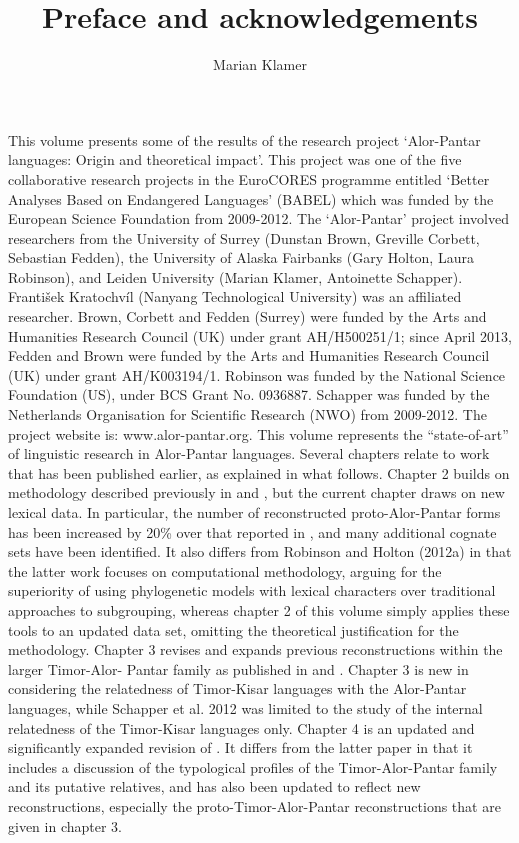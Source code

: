 \documentclass[output=paper]{LSP/langsci}
\author{Marian Klamer}
\title{Preface and acknowledgements}
\begin{document}
This volume presents some of the results of the research project `Alor-Pantar languages: Origin and theoretical impact'. This project was one of the five collaborative research projects in the EuroCORES programme entitled `Better Analyses Based on Endangered Languages' (BABEL) which was funded by the European Science Foundation from 2009-2012. The `Alor-Pantar' project involved researchers from the University of Surrey (Dunstan Brown, Greville Corbett, Sebastian Fedden), the University of Alaska Fairbanks (Gary Holton, Laura Robinson), and Leiden University (Marian Klamer, Antoinette Schapper). František Kratochvíl (Nanyang Technological University) was an affiliated researcher. Brown, Corbett and Fedden (Surrey) were funded by the Arts and Humanities Research Council (UK) under grant AH/H500251/1; since April 2013, Fedden and Brown were funded by the Arts and Humanities Research Council (UK) under grant AH/K003194/1. Robinson was funded by the National Science Foundation (US), under BCS Grant No. 0936887. Schapper was funded by the Netherlands Organisation for Scientific Research (NWO) from 2009-2012. The project website is: www.alor-pantar.org.  
	This volume represents the ``state-of-art'' of linguistic research in Alor-Pantar languages. Several chapters relate to work that has been published earlier, as explained in what follows. 
	Chapter 2 builds on methodology described previously in \citet{HoltonEtAl2012} and \citet{RobinsonEtAl2012internal}, but the current chapter draws on new lexical data. In particular, the number of reconstructed proto-Alor-Pantar forms has been increased by 20\% over that reported in \citet{HoltonEtAl2012}, and many additional cognate sets have been identified. It also differs from Robinson and Holton (2012a) in that the latter work focuses on computational methodology, arguing for the superiority of using phylogenetic models with lexical characters over traditional approaches to subgrouping, whereas chapter 2 of this volume simply applies these tools to an updated data set, omitting the theoretical justification for the methodology. 
	Chapter 3 revises and expands previous reconstructions within the larger Timor-Alor- Pantar family as published in \citet{HoltonEtAl2012} and \citet{SchapperEtAl2012}. Chapter 3 is new in considering the relatedness of Timor-Kisar languages with the Alor-Pantar languages, while Schapper et al. 2012 was limited to the study of the internal relatedness of the Timor-Kisar languages only.
	Chapter 4 is an updated and significantly expanded revision of \citet{RobinsonEtAl2012reassessing}. It differs from the latter paper in that it includes a discussion of the typological profiles of the Timor-Alor-Pantar family and its putative relatives, and has also been updated to reflect new reconstructions, especially the proto-Timor-Alor-Pantar reconstructions that are given in chapter 3. 
\end{document}
